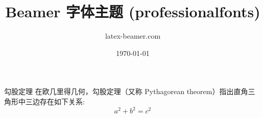 \documentclass{ctexbeamer}
\title{Beamer 字体主题 (professionalfonts)}
\author{latex-beamer.com}
\date{\today}
\begin{document}
\begin{frame}
  \titlepage 
\end{frame}

\begin{frame}
   
\begin{block}{勾股定理}
在欧几里得几何，勾股定理（又称 Pythagorean theorem）指出直角三角形中三边存在如下关系:
\begin{equation}
  a^{2}+b^{2}=c^{2}
\end{equation}  
\end{block}   
 
\end{frame}
\end{document}
